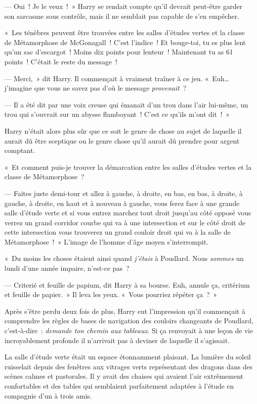 --- Oui~! Je le veux~!~» Harry se rendait compte qu'il devrait peut-être garder son sarcasme sous contrôle, mais il ne semblait pas capable de s'en empêcher.

«~Les ténèbres peuvent être trouvées entre les salles d'études vertes et la classe de Métamorphose de McGonagall~! C'est l'indice~! Et bouge-toi, tu es plus lent qu'un sac d'escargot~! Moins dix points pour lenteur~! Maintenant tu as 61 points~! C'était le reste du message~!

--- Merci,~» dit Harry. Il commençait à vraiment traîner à ce jeu. «~Euh… j'imagine que vous ne savez pas d'où le message \emph{provenait}~?

--- Il a été dit par une voix creuse qui émanait d'un trou dans l'air lui-même, un trou qui s'ouvrait sur un abysse flamboyant~! C'est ce qu'ils m'ont dit~!~»

Harry n'était alors plus sûr que ce soit le genre de chose au sujet de laquelle il aurait dû être sceptique ou le genre chose qu'il aurait dû prendre pour argent comptant.

«~Et comment puis-je trouver la démarcation entre les salles d'études vertes et la classe de Métamorphose~?

--- Faites juste demi-tour et allez à gauche, à droite, en bas, en bas, à droite, à gauche, à droite, en haut et à nouveau à gauche, vous ferez face à une grande salle d'étude verte et si vous entrez marchez tout droit jusqu'au côté opposé vous verrez un grand corridor courbe qui va à une intersection et sur le côté droit de cette intersection vous trouverez un grand couloir droit qui va à la salle de Métamorphose~!~» L'image de l'homme d'âge moyen s'interrompit.

«~Du moins les choses étaient ainsi quand \emph{j'étais} à Poudlard. Nous \emph{sommes} un lundi d'une année impaire, n'est-ce pas~?

--- Criterié et feuille de papium, dit Harry à sa bourse. Euh, annule ça, critérium et feuille de papier.~» Il leva les yeux. «~Vous pourriez répéter ça~?~»

Après s'être perdu deux fois de plus, Harry eut l'impression qu'il commençait à comprendre les règles de bases de navigation des couloirs changeants de Poudlard, c'est-à-dire~: \emph{demande ton chemin aux tableaux}. Si ça renvoyait à une leçon de vie incroyablement profonde il n'arrivait pas à deviner de laquelle il s'agissait.

La salle d'étude verte était un espace étonnamment plaisant. La lumière du soleil ruisselait depuis des fenêtres aux vitrages verts représentant des dragons dans des scènes calmes et pastorales. Il y avait des chaises qui avaient l'air extrêmement confortables et des tables qui semblaient parfaitement adaptées à l'étude en compagnie d'un à trois amis.

